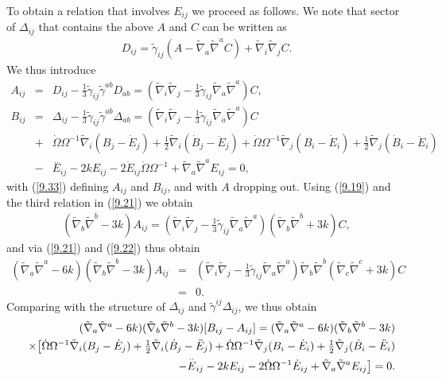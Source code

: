 To obtain a relation that involves $E_{ij}$ we proceed as follows. We note that sector of $\Delta_{ij}$ that contains the above $A$ and $C$ can be written as 
%
\begin{eqnarray}
D_{ij}=\tilde{\gamma}_{ij}(A-\tilde{\nabla}_a\tilde{\nabla}^aC)+\tilde{\nabla}_i\tilde{\nabla}_jC.
\label{9.32}
\end{eqnarray}
%
We thus introduce 
%
\begin{eqnarray}
A_{ij}&=&D_{ij}-\frac{1}{3}\tilde{\gamma}_{ij}\tilde{\gamma}^{ab}D_{ab}=(\tilde{\nabla}_i\tilde{\nabla}_j-\tfrac{1}{3} \tilde{\gamma}_{ij}\tilde{\nabla}_a\tilde{\nabla}^a)C,
\nonumber\\
B_{ij}&=&\Delta_{ij}-\frac{1}{3}\tilde{\gamma}_{ij}\tilde{\gamma}^{ab}\Delta_{ab}=(\tilde{\nabla}_i\tilde{\nabla}_j-\tfrac{1}{3} \tilde{\gamma}_{ij}\tilde{\nabla}_a\tilde{\nabla}^a)C
\nonumber\\
&+&\dot{\Omega} \Omega^{-1} \tilde{\nabla}_{i}(B_{j}-\dot E_j)+\tfrac{1}{2} \tilde{\nabla}_{i}(\dot{B}_{j}-\ddot{E}_j)
+\dot{\Omega} \Omega^{-1} \tilde{\nabla}_{j}(B_{i}-\dot E_i)+\tfrac{1}{2} \tilde{\nabla}_{j}(\dot{B}_{i}-\ddot{E}_i)
\nonumber\\
&-& \overset{..}{E}_{ij} - 2 k E_{ij} - 2 \dot{E}_{ij} \dot{\Omega} \Omega^{-1} + \tilde{\nabla}_{a}\tilde{\nabla}^{a}E_{ij}=0,
\label{9.33}
\end{eqnarray}
%
with (\ref{9.33}) defining $A_{ij}$ and $B_{ij}$, and with $A$ dropping out. Using (\ref{9.19}) and the third relation in (\ref{9.21}) we obtain
%
\begin{eqnarray}
(\tilde{\nabla}_b\tilde{\nabla}^b-3k)A_{ij}=
(\tilde{\nabla}_i\tilde{\nabla}_j-\tfrac{1}{3} \tilde{\gamma}_{ij}\tilde{\nabla}_a\tilde{\nabla}^a)(\tilde{\nabla}_b\tilde{\nabla}^b+3k)C,
\label{9.34}
\end{eqnarray}
%
and via (\ref{9.21}) and (\ref{9.22}) thus obtain 
%
\begin{eqnarray}
(\tilde{\nabla}_a\tilde{\nabla}^a-6k)(\tilde{\nabla}_b\tilde{\nabla}^b-3k)A_{ij}&=&
(\tilde{\nabla}_i\tilde{\nabla}_j-\tfrac{1}{3} \tilde{\gamma}_{ij}\tilde{\nabla}_a\tilde{\nabla}^a)\tilde{\nabla}_b\tilde{\nabla}^b(\tilde{\nabla}_c\tilde{\nabla}^c+3k)C
\nonumber\\
&=&0.
\label{9.35}
\end{eqnarray}
%
Comparing with the structure of $\Delta_{ij}$ and $\tilde{\gamma}^{ij}\Delta_{ij}$, we thus obtain
%
\begin{eqnarray}
&&(\tilde{\nabla}_a\tilde{\nabla}^a-6k)(\tilde{\nabla}_b\tilde{\nabla}^b-3k)[B_{ij}-A_{ij}]
=(\tilde{\nabla}_a\tilde{\nabla}^a-6k)(\tilde{\nabla}_b\tilde{\nabla}^b-3k)
\nonumber\\
&&\times
\big{[}\dot{\Omega} \Omega^{-1} \tilde{\nabla}_{i}(B_{j}-\dot E_j)+\tfrac{1}{2} \tilde{\nabla}_{i}(\dot{B}_{j}-\ddot{E}_j)
+\dot{\Omega} \Omega^{-1} \tilde{\nabla}_{j}(B_{i}-\dot E_i)+\tfrac{1}{2} \tilde{\nabla}_{j}(\dot{B}_{i}-\ddot{E}_i)
\nonumber\\
&& -\overset{..}{E}_{ij} - 2 k E_{ij} - 2  \dot{\Omega} \Omega^{-1}\dot{E}_{ij} + \tilde{\nabla}_{a}\tilde{\nabla}^{a}E_{ij}\big{]}=0.
\label{9.36}
\end{eqnarray}
